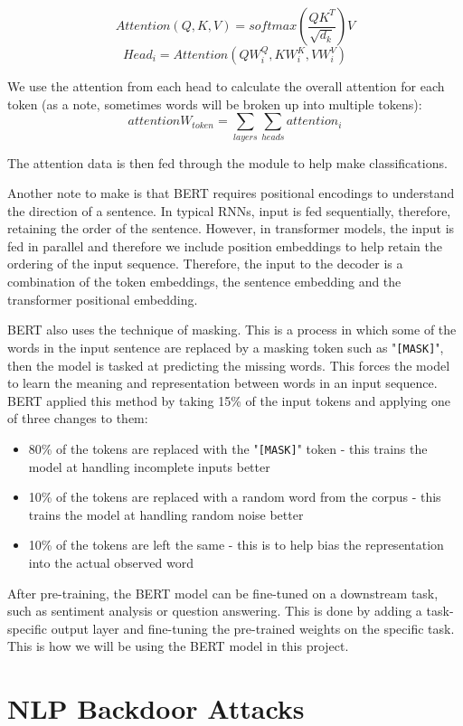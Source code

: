 $$
Attention(Q,K,V) = softmax \left( \frac{QK^T}{\sqrt{d_k} } \right) V
$$
$$
Head_i = Attention(QW_i^Q, KW_i^K, VW_i^V)
$$

We use the attention from each head to calculate the overall attention for each token (as a note, sometimes words will be broken up into multiple tokens):
$$
attentionW_{token} = \sum_{layers}\sum_{heads} attention_i
$$

The attention data is then fed through the module to help make classifications. 

Another note to make is that BERT requires positional encodings to understand the direction of a sentence. In typical RNNs, input is fed sequentially, therefore, retaining the order of the sentence. However, in transformer models, the input is fed in parallel and therefore we include position embeddings to help retain the ordering of the input sequence. Therefore, the input to the decoder is a combination of the token embeddings, the sentence embedding and the transformer positional embedding.

BERT also uses the technique of masking. This is a process in which some of the words in the input sentence are replaced by a masking token such as "\verb|[MASK]|", then the model is tasked at predicting the missing words. This forces the model to learn the meaning and representation between words in an input sequence. BERT applied this method by taking 15\% of the input tokens and applying one of three changes to them:

\begin{itemize}
    \item 80\% of the tokens are replaced with the "\verb|[MASK]|" token - this trains the model at handling incomplete inputs better
    \item 10\% of the tokens are replaced with a random word from the corpus - this trains the model at handling random noise better
    \item 10\% of the tokens are left the same - this is to help bias the representation into the actual observed word
\end{itemize} 

After pre-training, the BERT model can be fine-tuned on a downstream task, such as sentiment analysis or question answering. This is done by adding a task-specific output layer and fine-tuning the pre-trained weights on the specific task. This is how we will be using the BERT model in this project.


\section{NLP Backdoor Attacks}

